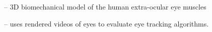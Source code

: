 
\cite{priamikov14_openeyesim} -- 3D biomechanical model of the human extra-ocular eye muscles

\cite{swirski2014rendering} -- uses rendered videos of eyes to evaluate eye tracking algorithms.




